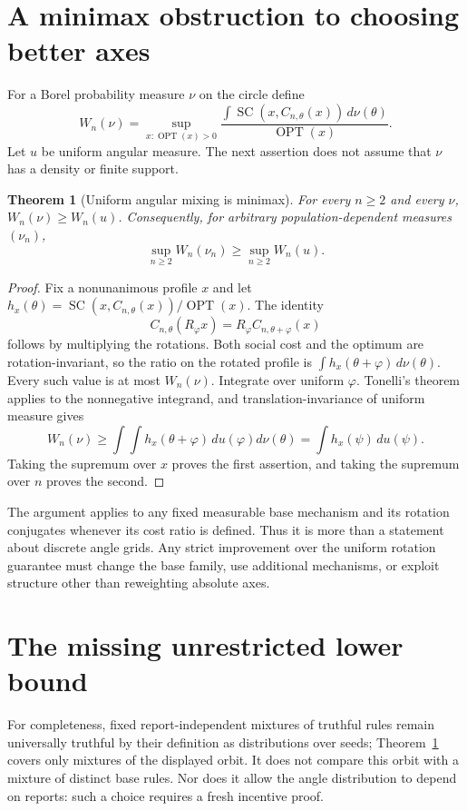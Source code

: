 \documentclass[11pt]{article}
\newtheorem{theorem}{Theorem}
\theoremstyle{definition}
\DeclareMathOperator{\SC}{SC}
\DeclareMathOperator{\OPT}{OPT}
\begin{document}
\section{A minimax obstruction to choosing better axes}
For a Borel probability measure $\nu$ on the circle define
\[
 W_n(\nu)=\sup_{x:\OPT(x)>0}
 \frac{\int\SC(x,C_{n,\theta}(x))\,d\nu(\theta)}{\OPT(x)}.
\]
Let $u$ be uniform angular measure. The next assertion does not assume
that $\nu$ has a density or finite support.
\begin{theorem}[Uniform angular mixing is minimax]\label{minimax}
For every $n\ge2$ and every $\nu$, $W_n(\nu)\ge W_n(u)$.
Consequently, for arbitrary population-dependent measures $(\nu_n)$,
\[
 \sup_{n\ge2}W_n(\nu_n)\ge\sup_{n\ge2}W_n(u).
\]
\end{theorem}
\begin{proof}
Fix a nonunanimous profile $x$ and let
$h_x(\theta)=\SC(x,C_{n,\theta}(x))/\OPT(x)$.
The identity
\[
 C_{n,\theta}(R_\varphi x)=R_\varphi C_{n,\theta+\varphi}(x)
\]
follows by multiplying the rotations. Both social cost and the optimum
are rotation-invariant, so the ratio on the rotated profile is
$\int h_x(\theta+\varphi)\,d\nu(\theta)$. Every such value is at most
$W_n(\nu)$. Integrate over uniform $\varphi$. Tonelli's theorem applies
to the nonnegative integrand, and translation-invariance of uniform
measure gives
\[
 W_n(\nu)\ge
 \int\!\int h_x(\theta+\varphi)\,du(\varphi)d\nu(\theta)
 =\int h_x(\psi)\,du(\psi).
\]
Taking the supremum over $x$ proves the first assertion, and taking the
supremum over $n$ proves the second.
\end{proof}
The argument applies to any fixed measurable base mechanism and its
rotation conjugates whenever its cost ratio is defined. Thus it is more
than a statement about discrete angle grids. Any strict improvement over
the uniform rotation guarantee must change the base family, use additional
mechanisms, or exploit structure other than reweighting absolute axes.

\section{The missing unrestricted lower bound}
For completeness, fixed report-independent mixtures of truthful rules
remain universally truthful by their definition as distributions over
seeds; Theorem~\ref{minimax} covers only mixtures of the displayed orbit.
It does not compare this orbit with a mixture of distinct base rules.
Nor does it allow the angle distribution to depend on reports: such a
choice requires a fresh incentive proof.
\end{document}

